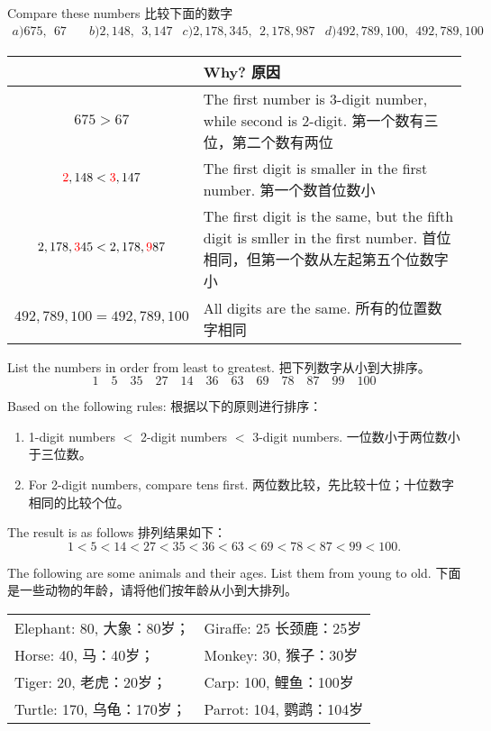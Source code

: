\begin{example}
Compare these numbers 比较下面的数字
$$
\begin{matrix}
a) 675,\ \  67\quad & b)  2,148,\ \ 3,147  & c)  2,178,345,\ \ 2,178,987 & d) 492,789,100, \ \ 492,789,100
\end{matrix}
$$
\end{example}
\begin{solution}

{
\centering
\begin{tabular}{|c|p{10cm}|}
\toprule	
& \parbox[c]{10cm}{\centering Why? 原因}\\
\midrule
$675 > 67$ & The first number is 3-digit number, while second is 2-digit. 第一个数有三位，第二个数有两位\\ \hline
${\color{red}2},148 < {\color{red}3},147$ & The first digit is smaller in the first number. 第一个数首位数小\\ \hline
$2,178,{\color{red}3}45 < 2,178,{\color{red}9}87$& The first digit is the same, but the fifth digit is smller in the first number. 首位相同，但第一个数从左起第五个位数字小\\ \hline
$492,789,100=492,789,100$ & All digits are the same. 所有的位置数字相同\\
\bottomrule
\end{tabular}
}

\end{solution}

\begin{example}
List the numbers in order from least to greatest. 把下列数字从小到大排序。
$$
1\quad 5\quad 35\quad 27\quad 14\quad 36\quad 63\quad 69\quad 78\quad 87\quad 99\quad 100 
$$
\end{example}
\begin{solution}
Based on the following rules: 根据以下的原则进行排序：
\begin{enumerate}
\item 1-digit numbers $<$ 2-digit numbers $<$ 3-digit numbers. 一位数小于两位数小于三位数。
\item For 2-digit numbers, compare tens first. 两位数比较，先比较十位；十位数字相同的比较个位。
\end{enumerate}
The result is as follows 排列结果如下：
$$
1<5<14<27<35<36<63<69<78<87<99<100.
$$
\end{solution}

\begin{example}
The following are some animals and their ages. List them from young to old. 下面是一些动物的年龄，请将他们按年龄从小到大排列。

\begin{tabular}{ll}
Elephant: 80, 大象：80岁；& Giraffe: 25 长颈鹿：25岁\\
Horse: 40, 马：40岁； & Monkey: 30, 猴子：30岁\\
Tiger: 20, 老虎：20岁； & Carp: 100, 鲤鱼：100岁\\
Turtle: 170, 乌龟：170岁； & Parrot: 104, 鹦鹉：104岁
\end{tabular}
\end{example}

